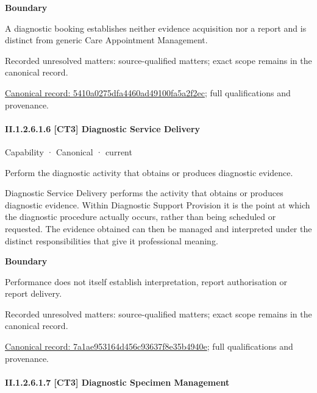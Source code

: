 \textbf{Boundary}



A diagnostic booking establishes neither evidence acquisition nor a report and is distinct from generic Care Appointment Management.


{\small Recorded unresolved matters: source-qualified matters; exact scope remains in the canonical record.}\par
{\footnotesize \href{../../../../../../../continuum/strategy/capability/5410a0275dfa4460ad49100fa5a2f2ec.md}{Canonical record: 5410a0275dfa4460ad49100fa5a2f2ec}; full qualifications and provenance.}\par
\paragraph*{II.1.2.6.1.6 [CT3] Diagnostic Service Delivery}
\label{navigation:II.1.2.6.1.6}

\label{element:7a1ae953164d456c93637f8e35b4940e}
{\small Capability · Canonical · current}\par

Perform the diagnostic activity that obtains or produces diagnostic evidence.



Diagnostic Service Delivery performs the activity that obtains or produces diagnostic evidence. Within Diagnostic Support Provision it is the point at which the diagnostic procedure actually occurs, rather than being scheduled or requested. The evidence obtained can then be managed and interpreted under the distinct responsibilities that give it professional meaning.



\textbf{Boundary}



Performance does not itself establish interpretation, report authorisation or report delivery.


{\small Recorded unresolved matters: source-qualified matters; exact scope remains in the canonical record.}\par
{\footnotesize \href{../../../../../../../continuum/strategy/capability/7a1ae953164d456c93637f8e35b4940e.md}{Canonical record: 7a1ae953164d456c93637f8e35b4940e}; full qualifications and provenance.}\par
\paragraph*{II.1.2.6.1.7 [CT3] Diagnostic Specimen Management}
\label{navigation:II.1.2.6.1.7}

